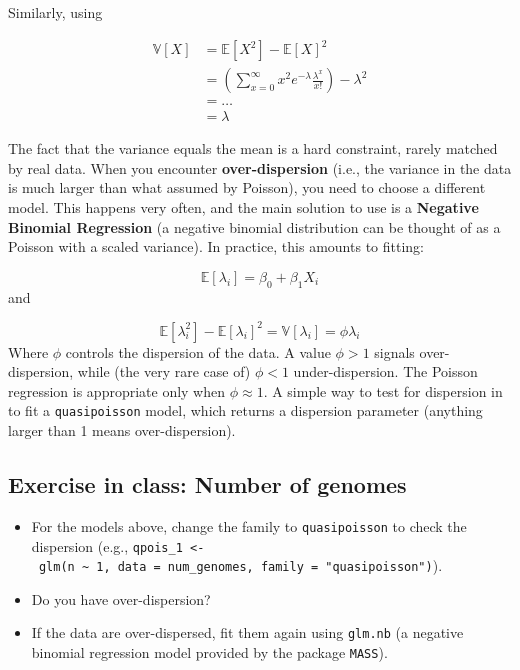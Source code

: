 \documentclass[
  letterpaper,
  DIV=11,
  numbers=noendperiod]{scrreprt}
\providecommand{\tightlist}{%
  \setlength{\itemsep}{0pt}\setlength{\parskip}{0pt}}\usepackage{longtable,booktabs,array}
\begin{document}
Similarly, using

\[
\begin{aligned}
\mathbb V[X] &= \mathbb E[X^2]-\mathbb E[X]^2\\
&= \left(\sum_{x = 0}^{\infty} x^2 e^{-\lambda} \frac{\lambda^x}{x!} \right) - \lambda^2 \\
&= \ldots\\
&= \lambda
\end{aligned}
\]

The fact that the variance equals the mean is a hard constraint, rarely
matched by real data. When you encounter \textbf{over-dispersion} (i.e.,
the variance in the data is much larger than what assumed by Poisson),
you need to choose a different model. This happens very often, and the
main solution to use is a \textbf{Negative Binomial Regression} (a
negative binomial distribution can be thought of as a Poisson with a
scaled variance). In practice, this amounts to fitting:

\[
\mathbb E[\lambda_i] = \beta_0 + \beta_1 X_i
\] and

\[
\mathbb E[\lambda_i^2] - \mathbb E[\lambda_i]^2 = \mathbb V[\lambda_i] = \phi \lambda_i
\] Where \(\phi\) controls the dispersion of the data. A value
\(\phi > 1\) signals over-dispersion, while (the very rare case of)
\(\phi < 1\) under-dispersion. The Poisson regression is appropriate
only when \(\phi \approx 1\). A simple way to test for dispersion in to
fit a \texttt{quasipoisson} model, which returns a dispersion parameter
(anything larger than 1 means over-dispersion).

\hypertarget{exercise-in-class-number-of-genomes-1}{%
\subsection{Exercise in class: Number of
genomes}\label{exercise-in-class-number-of-genomes-1}}

\begin{itemize}
\tightlist
\item
  For the models above, change the family to \texttt{quasipoisson} to
  check the dispersion (e.g.,
  \texttt{qpois\_1\ \textless{}-\ glm(n\ \textasciitilde{}\ 1,\ data\ =\ num\_genomes,\ family\ =\ "quasipoisson")}).
\item
  Do you have over-dispersion?
\item
  If the data are over-dispersed, fit them again using \texttt{glm.nb}
  (a negative binomial regression model provided by the package
  \texttt{MASS}).
\end{itemize}
\end{document}
